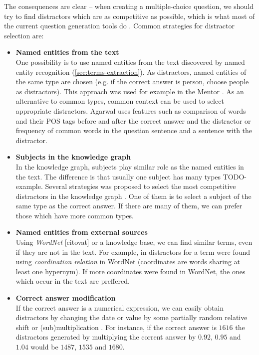 \documentclass[a4paper, 12pt, twoside]{fithesis2}		%
\renewcommand{\_}{\leavevmode \kern0.07em\vbox{\hrule width0.4em}}
\newcommand{\squarebullet}{\textcolor{black}{\raisebox{0.15em}{\rule{4pt}{4pt}}}}
\newcommand{\emptysquarebullet}{\textcolor{black}{\raisebox{0.10em}{\tiny$\square$}}}
\newenvironment{myItemize}{
  \begin{itemize}[leftmargin=2em,rightmargin=1em,itemsep=\parskip ,parsep=0em,topsep=0em,partopsep=0em]
  \renewcommand{\labelitemi}{\squarebullet}
  \renewcommand{\labelitemii}{\textbullet}
}{
  \end{itemize}
}
\newcounter{choice}
\begin{document}
The consequences are clear -- when creating a multiple-choice question, we should try to find distractors which are as competitive as possible,
which is what most of the current question generation tools do
\cite{question-gen-mitkov, question-gen-textbooks, mentor}.
Common strategies for distractor selection are:
\begin{myItemize}
\item \textbf{Named entities from the text}\\
  One possibility is to use named entities from the text discovered by named entity recognition (\autoref{sec:terms-extraction}). As distractors, named entities of the same type are chosen (e.g. if the correct answer is person, choose people as distractors). This approach was used for example in the Mentor \cite{mentor}.
As an alternative to common types, common context can be used to select appropriate distractors.
Agarwal \cite{question-gen-textbooks} uses features such as comparison of words and their POS tags before and after the correct answer and the distractor or frequency of common words in the question sentence and a sentence with the distractor.

\item \textbf{Subjects in the knowledge graph}\\
In the knowledge graph, subjects play similar role as the named entities in the text.
The difference is that usually one subject has many types TODO-example.
Several strategies was proposed to select the most competitive distractors in the knowledge graph \cite{ontoque, question-gen-domain-ontologies}. One of them is to select a subject of the same type as the correct answer. If there are many of them, we can prefer those which have more common types.

\item \textbf{Named entities from external sources}\\
  Using \textit{WordNet} [citovat] or a knowledge base, we can find similar terms, even if they are not in the text. For example, in \cite{question-gen-mitkov} distractors for a term were found using \textit{coordination relation} in WordNet (coordinates are words sharing at least one hypernym). If more coordinates were found in WordNet, the ones which occur in the text are preffered.

\item \textbf{Correct answer modification}\\
  If the correct answer is a numerical expression, we can easily obtain distractors by changing the date or value by some partially random relative shift or (sub)multiplication
\cite{question-gen-domain-ontologies}.
For instance, if the correct answer is $1616$ the distractors generated by multiplying the corrent answer by $0.92$, $0.95$ and $1.04$ would be $1487$, $1535$ and $1680$.
\end{myItemize}
\end{document}
